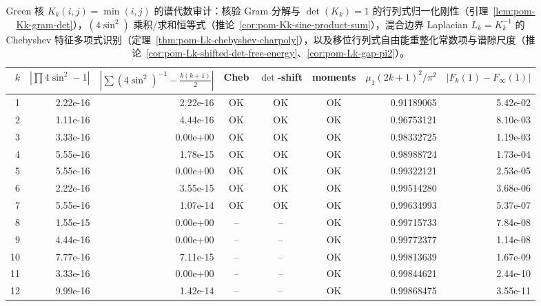 \begin{table}[H]
\centering
\scriptsize
\setlength{\tabcolsep}{6pt}
\caption{Green 核 $K_k(i,j)=\min(i,j)$ 的谱代数审计：核验 Gram 分解与 $\det(K_k)=1$ 的行列式归一化刚性（引理~\ref{lem:pom-Kk-gram-det}），$(4\sin^2)$ 乘积/求和恒等式（推论~\ref{cor:pom-Kk-sine-product-sum}），混合边界 Laplacian $L_k=K_k^{-1}$ 的 Chebyshev 特征多项式识别（定理~\ref{thm:pom-Lk-chebyshev-charpoly}），以及移位行列式自由能重整化常数项与谱隙尺度（推论~\ref{cor:pom-Lk-shifted-det-free-energy}、\ref{cor:pom-Lk-gap-pi2}）。}
\label{tab:fence_green_kernel_spectral_algebra_audit}
\begin{tabular}{r r r c c c r r}
\toprule
$k$ & $|\prod 4\sin^2-1|$ & $|\sum (4\sin^2)^{-1}-\tfrac{k(k+1)}{2}|$ & Cheb & $\det$-shift & moments & $\mu_1(2k+1)^2/\pi^2$ & $|F_k(1)-F_\infty(1)|$\\
\midrule
1 & 2.22e-16 & 2.22e-16 & OK & OK & OK & 0.91189065 & 5.42e-02\\
2 & 1.11e-16 & 4.44e-16 & OK & OK & OK & 0.96753121 & 8.10e-03\\
3 & 3.33e-16 & 0.00e+00 & OK & OK & OK & 0.98332725 & 1.19e-03\\
4 & 5.55e-16 & 1.78e-15 & OK & OK & OK & 0.98988724 & 1.73e-04\\
5 & 5.55e-16 & 0.00e+00 & OK & OK & OK & 0.99322121 & 2.53e-05\\
6 & 2.22e-16 & 3.55e-15 & OK & OK & OK & 0.99514280 & 3.68e-06\\
7 & 5.55e-16 & 1.07e-14 & OK & OK & OK & 0.99634993 & 5.37e-07\\
8 & 1.55e-15 & 0.00e+00 & -- & -- & OK & 0.99715733 & 7.84e-08\\
9 & 4.44e-16 & 0.00e+00 & -- & -- & OK & 0.99772377 & 1.14e-08\\
10 & 7.77e-16 & 7.11e-15 & -- & -- & OK & 0.99813639 & 1.67e-09\\
11 & 3.33e-16 & 0.00e+00 & -- & -- & OK & 0.99844621 & 2.44e-10\\
12 & 9.99e-16 & 1.42e-14 & -- & -- & OK & 0.99868475 & 3.55e-11\\
\bottomrule
\end{tabular}
\end{table}
